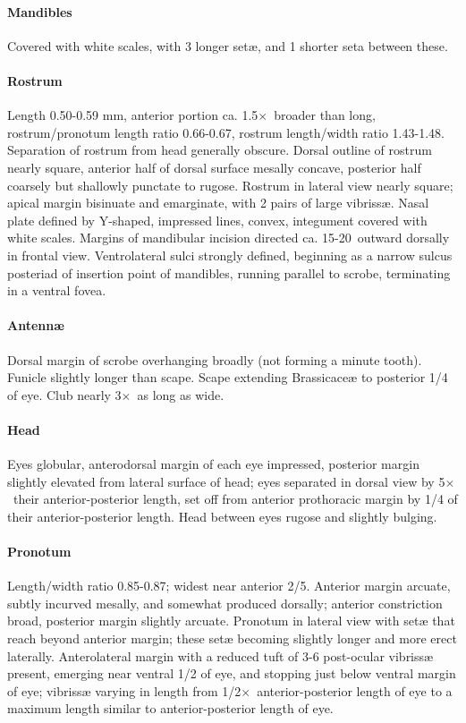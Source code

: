 \documentclass[fleqn,10pt,lineno]{wlpeerj} %
\newcommand{\td}{\textdegree~}
\newcommand{\x}{$\times$~}
\begin{document}
			\paragraph{Mandibles}
				Covered with white scales, with 3 longer set{\ae}, and 1 shorter seta between these.
			\paragraph{Rostrum}
				Length 0.50-0.59 mm, anterior portion ca. 1.5\x broader than long, rostrum/pronotum length ratio 0.66-0.67, rostrum length/width ratio 1.43-1.48.
				Separation of rostrum from head generally obscure. 
				Dorsal outline of rostrum nearly square, anterior half of dorsal surface mesally concave, posterior half coarsely but shallowly punctate to rugose. 
				Rostrum in lateral view nearly square; apical margin bisinuate and emarginate, with 2 pairs of large vibriss{\ae}. 
				Nasal plate defined by Y-shaped, impressed lines, convex, integument covered with white scales.
				Margins of mandibular incision directed ca. 15-20\td outward dorsally in frontal view. 
				Ventrolateral sulci strongly defined, beginning as a narrow sulcus posteriad of insertion point of mandibles, running parallel to scrobe, terminating in a ventral fovea.
			\paragraph{Antenn{\ae}}
				Dorsal margin of scrobe overhanging broadly (not forming a minute tooth).
				Funicle slightly longer than scape.
				Scape extending Brassicace{\ae}  to posterior 1/4 of eye.
				Club nearly 3\x as long as wide.
			\paragraph{Head}
				Eyes globular, anterodorsal margin of each eye impressed, posterior margin slightly elevated from lateral surface of head; eyes separated in dorsal view by 5\x their anterior-posterior length, set off from anterior prothoracic margin by 1/4 of their anterior-posterior length.
				Head between eyes rugose and slightly bulging.
			\paragraph{Pronotum}
				Length/width ratio 0.85-0.87; widest near anterior 2/5.
				Anterior margin arcuate, subtly incurved mesally, and somewhat produced dorsally; anterior constriction broad, posterior margin slightly arcuate.
				Pronotum in lateral view with set{\ae} that reach beyond anterior margin; these set{\ae} becoming slightly longer and more erect laterally.
				Anterolateral margin with a reduced tuft of 3-6 post-ocular vibriss{\ae} present, emerging near ventral 1/2 of eye, and stopping just below ventral margin of eye; vibriss{\ae} varying in length from 1/2\x anterior-posterior length of eye to a maximum length similar to anterior-posterior length of eye.
\end{document}
